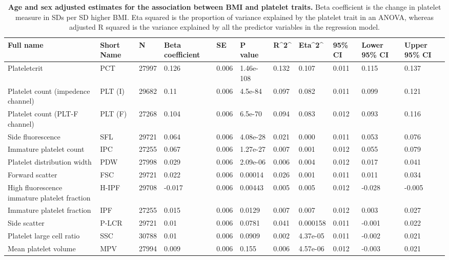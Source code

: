 \documentclass[11pt,twoside]{bristolthesis}
\begin{document}
\begin{landscape}\begin{table}

\caption[Age and sex adjusted estimates for the association between BMI and platelet traits]{\label{tab:BMI-platelets-unadjust}\textbf{Age and sex adjusted estimates for the association between BMI and platelet traits.} Βeta coefficient is the change in platelet measure in SDs per SD higher BMI. Eta squared is the proportion of variance explained by the platelet trait in an ANOVA, whereas adjusted R squared is the variance explained by all the predictor variables in the regression model.}
\centering
\begin{tabu} to 
\toprule
Full name & Short Name & N & Βeta coefficient & SE & P value & R\textasciicircum{}2\textasciicircum{} & Eta\textasciicircum{}2\textasciicircum{} & 95\% CI & Lower 95\% CI & Upper 95\% CI\\
\midrule
Plateletcrit & PCT & 27997 & 0.126 & 0.006 & 1.46e-108 & 0.132 & 0.107 & 0.011 & 0.115 & 0.137\\
Platelet count (impedence channel) & PLT (I) & 29682 & 0.11 & 0.006 & 4.5e-84 & 0.097 & 0.082 & 0.011 & 0.099 & 0.121\\
Platelet count (PLT-F channel) & PLT (F) & 27268 & 0.104 & 0.006 & 6.5e-70 & 0.094 & 0.083 & 0.012 & 0.093 & 0.116\\
Side fluorescence & SFL & 29721 & 0.064 & 0.006 & 4.08e-28 & 0.021 & 0.000 & 0.011 & 0.053 & 0.076\\
Immature platelet count & IPC & 27255 & 0.067 & 0.006 & 1.27e-27 & 0.007 & 0.001 & 0.012 & 0.055 & 0.079\\
\addlinespace
Platelet distribution width & PDW & 27998 & 0.029 & 0.006 & 2.09e-06 & 0.006 & 0.004 & 0.012 & 0.017 & 0.041\\
Forward scatter & FSC & 29721 & 0.022 & 0.006 & 0.00014 & 0.026 & 0.001 & 0.011 & 0.011 & 0.034\\
High fluorescence immature platelet fraction & H-IPF & 29708 & -0.017 & 0.006 & 0.00443 & 0.005 & 0.005 & 0.012 & -0.028 & -0.005\\
Immature platelet fraction & IPF & 27255 & 0.015 & 0.006 & 0.0129 & 0.007 & 0.007 & 0.012 & 0.003 & 0.027\\
Side scatter & P-LCR & 29721 & 0.01 & 0.006 & 0.0781 & 0.041 & 0.000158 & 0.011 & -0.001 & 0.022\\
\addlinespace
Platelet large cell ratio & SSC & 30788 & 0.01 & 0.006 & 0.0909 & 0.002 & 4.37e-05 & 0.011 & -0.002 & 0.021\\
Mean platelet volume & MPV & 27994 & 0.009 & 0.006 & 0.155 & 0.006 & 4.57e-06 & 0.012 & -0.003 & 0.021\\
\bottomrule
\end{tabu}
\end{table}
\end{landscape}
\end{document}
